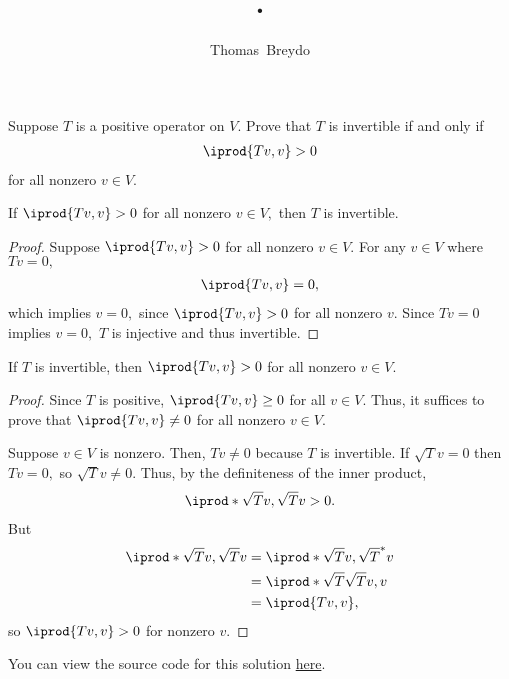 \documentclass{amsart}
\title{\pagenum.\probnum}
\author{Thomas\ Breydo}
\newcommand{\pagenum}{232}
\newcommand{\probnum}{7}
\begin{document}
\maketitle

\begin{problem*}
Suppose $T$ is a positive operator on $V.$ Prove that $T$ 
is invertible if and only if
\begin{align*}
    \iprod{Tv,v}>0
\end{align*}
for all nonzero $v\in V.$
\end{problem*}

\vspace{0.5in}

\begin{claim*}
If $\iprod{Tv,v}>0$ for all nonzero $v\in V,$
then $T$ is invertible.
\end{claim*}
\begin{proof}
Suppose $\iprod{Tv,v}>0$ for all nonzero $v\in V.$
For any $v\in V$ where $Tv=0,$
\begin{align*}
\iprod{Tv,v}=0,
\end{align*}
which implies $v=0,$ since $\iprod{Tv,v}>0$ for all nonzero $v.$ 
Since $Tv=0$ implies $v=0,$ $T$ is injective and
thus invertible.
\end{proof}

\begin{claim*}
If $T$ is invertible, then $\iprod{Tv,v}>0$ for all nonzero
$v\in V.$
\end{claim*}
\begin{proof}
Since $T$ is positive, $\iprod{Tv,v}\ge0$ for all $v\in V.$
Thus, it suffices
to prove that $\iprod{Tv,v}\ne0$ for all nonzero $v\in V.$

Suppose $v\in V$ is nonzero.
Then, $Tv\ne 0$ because $T$ is invertible.
If $\sqrt Tv=0$ then $Tv=0,$ so $\sqrt Tv\ne 0.$
Thus, by the definiteness of the inner product,
\begin{align*}
    \iprod*{\sqrt Tv,\sqrt Tv}>0.
\end{align*}
But
\begin{align*}
    \iprod*{\sqrt Tv,\sqrt Tv} &= \iprod*{\sqrt Tv,\sqrt T^*v} \\
                  &= \iprod*{\sqrt T\sqrt Tv,v} \\
                  &= \iprod{Tv,v}, 
\end{align*}
so $\iprod{Tv,v}>0$ for nonzero $v.$
\end{proof}

\vspace{0.5in}

\begin{note*}
You can view the source code for this solution
\href{https://github.com/thomasbreydo/linalg/blob/main/\pagenum_\probnum_Thomas_Breydo.tex}
{here}.
\end{note*}
\end{document}
